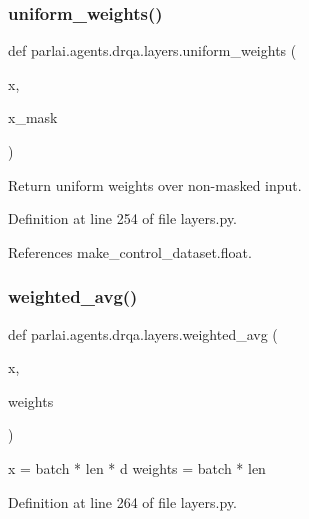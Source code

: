 \subsubsection{\texorpdfstring{uniform\+\_\+weights()}{uniform\_weights()}}
{\footnotesize\ttfamily def parlai.\+agents.\+drqa.\+layers.\+uniform\+\_\+weights (\begin{DoxyParamCaption}\item[{}]{x,  }\item[{}]{x\+\_\+mask }\end{DoxyParamCaption})}

\begin{DoxyVerb}Return uniform weights over non-masked input.\end{DoxyVerb}
 

Definition at line 254 of file layers.\+py.



References make\+\_\+control\+\_\+dataset.\+float.

\mbox{\label{namespaceparlai_1_1agents_1_1drqa_1_1layers_a8d0e781e00db1c2d843b21a056554f65}} 
\subsubsection{\texorpdfstring{weighted\+\_\+avg()}{weighted\_avg()}}
{\footnotesize\ttfamily def parlai.\+agents.\+drqa.\+layers.\+weighted\+\_\+avg (\begin{DoxyParamCaption}\item[{}]{x,  }\item[{}]{weights }\end{DoxyParamCaption})}

\begin{DoxyVerb}x = batch * len * d
weights = batch * len
\end{DoxyVerb}
 

Definition at line 264 of file layers.\+py.

